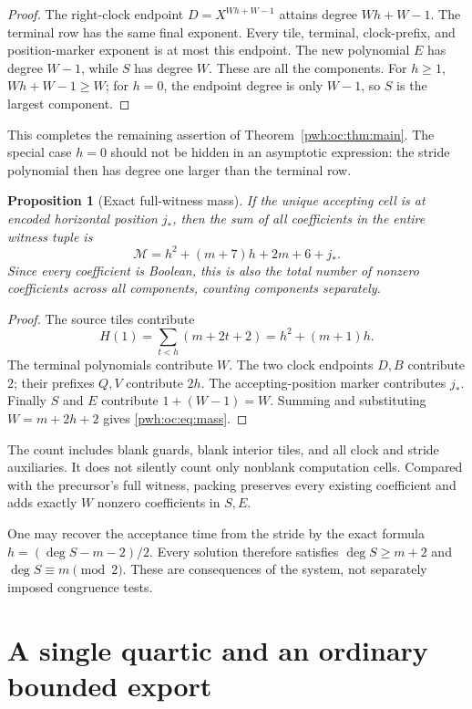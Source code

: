 \documentclass[11pt,letterpaper]{article}
\numberwithin{equation}{section}
\newtheorem{proposition}[theorem]{Proposition}
\theoremstyle{definition}
\begin{document}
\begin{proof}
The right-clock endpoint $D=X^{Wh+W-1}$ attains degree $Wh+W-1$.
The terminal row has the same final exponent. Every tile, terminal,
clock-prefix, and position-marker exponent is at most this endpoint.
The new polynomial $E$ has degree $W-1$, while $S$ has degree $W$.
These are all the components. For $h\ge1$, $Wh+W-1\ge W$; for $h=0$,
the endpoint degree is only $W-1$, so $S$ is the largest component.
\end{proof}

This completes the remaining assertion of Theorem~\ref{pwh:oc:thm:main}.
The special case $h=0$ should not be hidden in an asymptotic expression:
the stride polynomial then has degree one larger than the terminal row.

\begin{proposition}[Exact full-witness mass]
\label{pwh:oc:prop:mass}
If the unique accepting cell is at encoded horizontal position $j_*$,
then the sum of all coefficients in the entire witness tuple is
\begin{equation}
 \mathcal M=h^2+(m+7)h+2m+6+j_*.
 \label{pwh:oc:eq:mass}
\end{equation}
Since every coefficient is Boolean, this is also the total number of
nonzero coefficients across all components, counting components separately.
\end{proposition}

\begin{proof}
The source tiles contribute
\[
 H(1)=\sum_{t<h}(m+2t+2)=h^2+(m+1)h.
\]
The terminal polynomials contribute $W$. The two clock endpoints
$D,B$ contribute $2$; their prefixes $Q,V$ contribute $2h$.
The accepting-position marker contributes $j_*$. Finally $S$ and $E$
contribute $1+(W-1)=W$. Summing and substituting $W=m+2h+2$ gives
\eqref{pwh:oc:eq:mass}.
\end{proof}

The count includes blank guards, blank interior tiles, and all clock and
stride auxiliaries. It does not silently count only nonblank computation
cells. Compared with the precursor's full witness, packing preserves
every existing coefficient and adds exactly $W$ nonzero coefficients
in $S,E$.

One may recover the acceptance time from the stride by the exact formula
$h=(\deg S-m-2)/2$. Every solution therefore satisfies
$\deg S\ge m+2$ and $\deg S\equiv m\pmod2$. These are consequences of the
system, not separately imposed congruence tests.

\section{A single quartic and an ordinary bounded export}
\label{pwh:oc:sec:quartic}
\end{document}
